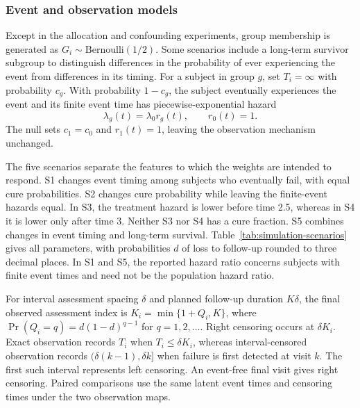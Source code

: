 \documentclass[12pt]{article}
\theoremstyle{definition}
\theoremstyle{remark}
\begin{document}
\subsubsection{Event and observation models}
\label{sec:simulation-model}

Except in the allocation and confounding experiments, group membership is generated as $G_i\sim\mathrm{Bernoulli}(1/2)$. Some scenarios include a long-term survivor subgroup to distinguish differences in the probability of ever experiencing the event from differences in its timing. For a subject in group $g$, set $T_i=\infty$ with probability $c_g$. With probability $1-c_g$, the subject eventually experiences the event and its finite event time has piecewise-exponential hazard
\begin{equation}
 \lambda_g(t)=\lambda_0r_g(t),\qquad r_0(t)=1.
 \label{eq:simulation-hazard}
\end{equation}
The null sets $c_1=c_0$ and $r_1(t)=1$, leaving the observation mechanism unchanged.

The five scenarios separate the features to which the weights are intended to respond. S1 changes event timing among subjects who eventually fail, with equal cure probabilities. S2 changes cure probability while leaving the finite-event hazards equal. In S3, the treatment hazard is lower before time 2.5, whereas in S4 it is lower only after time 3. Neither S3 nor S4 has a cure fraction. S5 combines changes in event timing and long-term survival. Table~\ref{tab:simulation-scenarios} gives all parameters, with probabilities $d$ of loss to follow-up rounded to three decimal places. In S1 and S5, the reported hazard ratio concerns subjects with finite event times and need not be the population hazard ratio.

For interval assessment spacing $\delta$ and planned follow-up duration $K\delta$, the final observed assessment index is $K_i=\min\{1+Q_i,K\}$, where $\Pr(Q_i=q)=d(1-d)^{q-1}$ for $q=1,2,\ldots$. Right censoring occurs at $\delta K_i$. Exact observation records $T_i$ when $T_i\leq\delta K_i$, whereas interval-censored observation records $(\delta(k-1),\delta k]$ when failure is first detected at visit $k$. The first such interval represents left censoring. An event-free final visit gives right censoring. Paired comparisons use the same latent event times and censoring times under the two observation maps.
\end{document}
